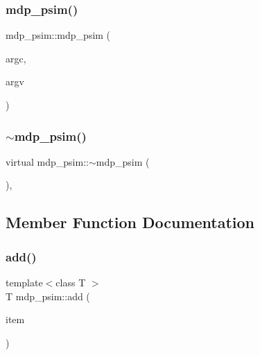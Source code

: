 \subsubsection{\texorpdfstring{mdp\+\_\+psim()}{mdp\_psim()}\hspace{0.1cm}{\footnotesize\ttfamily [2/2]}}
{\footnotesize\ttfamily mdp\+\_\+psim\+::mdp\+\_\+psim (\begin{DoxyParamCaption}\item[{int}]{argc,  }\item[{char $\ast$$\ast$}]{argv }\end{DoxyParamCaption})\hspace{0.3cm}{\ttfamily [inline]}}

\mbox{\label{classmdp__psim_ac6b26c66968872c6f6d71dff2bf0527f}} 
\subsubsection{\texorpdfstring{$\sim$mdp\+\_\+psim()}{~mdp\_psim()}}
{\footnotesize\ttfamily virtual mdp\+\_\+psim\+::$\sim$mdp\+\_\+psim (\begin{DoxyParamCaption}{ }\end{DoxyParamCaption})\hspace{0.3cm}{\ttfamily [inline]}, {\ttfamily [virtual]}}



\subsection{Member Function Documentation}
\mbox{\label{classmdp__psim_a6f515614ee8f4b3be99f5dd18b415aa8}} 
\subsubsection{\texorpdfstring{add()}{add()}}
{\footnotesize\ttfamily template$<$class T $>$ \\
T mdp\+\_\+psim\+::add (\begin{DoxyParamCaption}\item[{T \&}]{item }\end{DoxyParamCaption})\hspace{0.3cm}{\ttfamily [inline]}}

